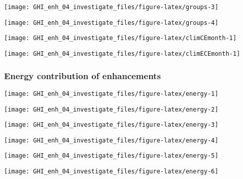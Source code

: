\documentclass[
  10pt,
  a4paper,oneside]{article}
\begin{document}
\begin{center}\texttt{[image: GHI\_enh\_04\_investigate\_files/figure-latex/groups-3]} \end{center}

\begin{center}\texttt{[image: GHI\_enh\_04\_investigate\_files/figure-latex/groups-4]} \end{center}

\begin{center}\texttt{[image: GHI\_enh\_04\_investigate\_files/figure-latex/climCEmonth-1]} \end{center}

\begin{center}\texttt{[image: GHI\_enh\_04\_investigate\_files/figure-latex/climECEmonth-1]} \end{center}

\newpage
\FloatBarrier

\hypertarget{energy-contribution-of-enhancements}{%
\subsubsection{Energy contribution of enhancements}\label{energy-contribution-of-enhancements}}

\begin{center}\texttt{[image: GHI\_enh\_04\_investigate\_files/figure-latex/energy-1]} \end{center}

\begin{center}\texttt{[image: GHI\_enh\_04\_investigate\_files/figure-latex/energy-2]} \end{center}

\begin{center}\texttt{[image: GHI\_enh\_04\_investigate\_files/figure-latex/energy-3]} \end{center}

\begin{center}\texttt{[image: GHI\_enh\_04\_investigate\_files/figure-latex/energy-4]} \end{center}

\begin{center}\texttt{[image: GHI\_enh\_04\_investigate\_files/figure-latex/energy-5]} \end{center}

\begin{center}\texttt{[image: GHI\_enh\_04\_investigate\_files/figure-latex/energy-6]} \end{center}
\end{document}
